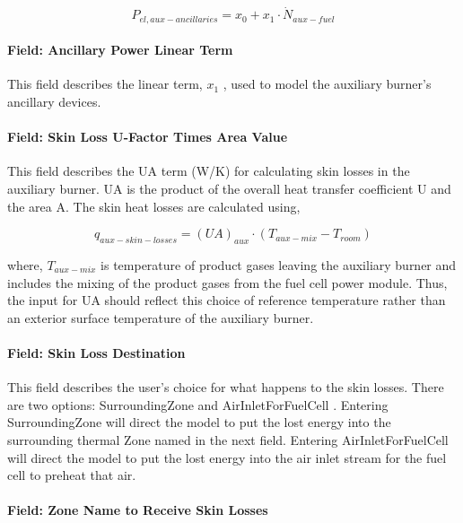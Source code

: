 \begin{equation}
{P_{el,aux - ancillaries}} = {x_0} + {x_1} \cdot {\dot N_{aux - fuel}}
\end{equation}

\paragraph{Field: Ancillary Power Linear Term}\label{field-ancillary-power-linear-term}

This field describes the linear term, \({x_1}\) , used to model the auxiliary burner's ancillary devices.

\paragraph{Field: Skin Loss U-Factor Times Area Value}\label{field-skin-loss-u-factor-times-area-value-1}

This field describes the UA term (W/K) for calculating skin losses in the auxiliary burner. UA is the product of the overall heat transfer coefficient U and the area A. The skin heat losses are calculated using,

\begin{equation}
{q_{aux - skin - losses}} = {(UA)_{aux}} \cdot ({T_{aux - mix}} - {T_{room}})
\end{equation}

where, \({T_{aux - mix}}\) is temperature of product gases leaving the auxiliary burner and includes the mixing of the product gases from the fuel cell power module. Thus, the input for UA should reflect this choice of reference temperature rather than an exterior surface temperature of the auxiliary burner.

\paragraph{Field: Skin Loss Destination}\label{field-skin-loss-destination}

This field describes the user's choice for what happens to the skin losses. There are two options: SurroundingZone and AirInletForFuelCell . Entering SurroundingZone will direct the model to put the lost energy into the surrounding thermal Zone named in the next field. Entering AirInletForFuelCell will direct the model to put the lost energy into the air inlet stream for the fuel cell to preheat that air.

\paragraph{Field: Zone Name to Receive Skin Losses}\label{field-zone-name-to-receive-skin-losses}

